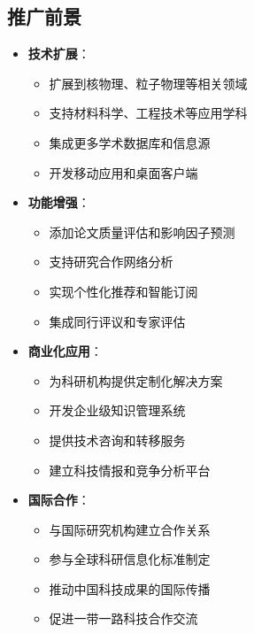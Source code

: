 \documentclass[12pt,a4paper]{article}
\begin{document}
\subsection{推广前景}
\begin{itemize}
    \item \textbf{技术扩展}：
        \begin{itemize}
            \item 扩展到核物理、粒子物理等相关领域
            \item 支持材料科学、工程技术等应用学科
            \item 集成更多学术数据库和信息源
            \item 开发移动应用和桌面客户端
        \end{itemize}
    
    \item \textbf{功能增强}：
        \begin{itemize}
            \item 添加论文质量评估和影响因子预测
            \item 支持研究合作网络分析
            \item 实现个性化推荐和智能订阅
            \item 集成同行评议和专家评估
        \end{itemize}
    
    \item \textbf{商业化应用}：
        \begin{itemize}
            \item 为科研机构提供定制化解决方案
            \item 开发企业级知识管理系统
            \item 提供技术咨询和转移服务
            \item 建立科技情报和竞争分析平台
        \end{itemize}
    
    \item \textbf{国际合作}：
        \begin{itemize}
            \item 与国际研究机构建立合作关系
            \item 参与全球科研信息化标准制定
            \item 推动中国科技成果的国际传播
            \item 促进一带一路科技合作交流
        \end{itemize}
\end{itemize}
\end{document}
